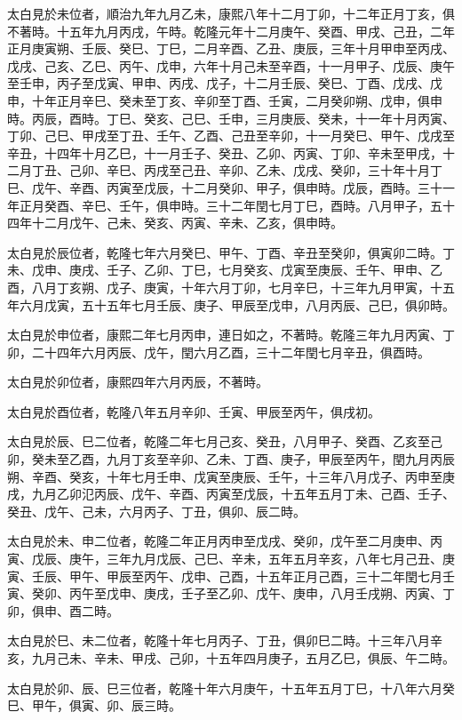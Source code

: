 \begin{pinyinscope}
太白見於未位者，順治九年九月乙未，康熙八年十二月丁卯，十二年正月丁亥，俱不著時。十五年九月丙戌，午時。乾隆元年十二月庚午、癸酉、甲戌、己丑，二年正月庚寅朔、壬辰、癸巳、丁巳，二月辛酉、乙丑、庚辰，三年十月甲申至丙戌、戊戌、己亥、乙巳、丙午、戊申，六年十月己未至辛酉，十一月甲子、戊辰、庚午至壬申，丙子至戊寅、甲申、丙戌、戊子，十二月壬辰、癸巳、丁酉、戊戌、戊申，十年正月辛巳、癸未至丁亥、辛卯至丁酉、壬寅，二月癸卯朔、戊申，俱申時。丙辰，酉時。丁巳、癸亥、己巳、壬申，三月庚辰、癸未，十一年十月丙寅、丁卯、己巳、甲戌至丁丑、壬午、乙酉、己丑至辛卯，十一月癸巳、甲午、戊戌至辛丑，十四年十月乙巳，十一月壬子、癸丑、乙卯、丙寅、丁卯、辛未至甲戌，十二月丁丑、己卯、辛巳、丙戌至己丑、辛卯、乙未、戊戌、癸卯，三十年十月丁巳、戊午、辛酉、丙寅至戊辰，十二月癸卯、甲子，俱申時。戊辰，酉時。三十一年正月癸酉、辛巳、壬午，俱申時。三十二年閏七月丁巳，酉時。八月甲子，五十四年十二月戊午、己未、癸亥、丙寅、辛未、乙亥，俱申時。

太白見於辰位者，乾隆七年六月癸巳、甲午、丁酉、辛丑至癸卯，俱寅卯二時。丁未、戊申、庚戌、壬子、乙卯、丁巳，七月癸亥、戊寅至庚辰、壬午、甲申、乙酉，八月丁亥朔、戊子、庚寅，十年六月丁卯，七月辛巳，十三年九月甲寅，十五年六月戊寅，五十五年七月壬辰、庚子、甲辰至戊申，八月丙辰、己巳，俱卯時。

太白見於申位者，康熙二年七月丙申，連日如之，不著時。乾隆三年九月丙寅、丁卯，二十四年六月丙辰、戊午，閏六月乙酉，三十二年閏七月辛丑，俱酉時。

太白見於卯位者，康熙四年六月丙辰，不著時。

太白見於酉位者，乾隆八年五月辛卯、壬寅、甲辰至丙午，俱戌初。

太白見於辰、巳二位者，乾隆二年七月己亥、癸丑，八月甲子、癸酉、乙亥至己卯，癸未至乙酉，九月丁亥至辛卯、乙未、丁酉、庚子，甲辰至丙午，閏九月丙辰朔、辛酉、癸亥，十年七月壬申、戊寅至庚辰、壬午，十三年八月戊子、丙申至庚戌，九月乙卯氾丙辰、戊午、辛酉、丙寅至戊辰，十五年五月丁未、己酉、壬子、癸丑、戊午、己未，六月丙子、丁丑，俱卯、辰二時。

太白見於未、申二位者，乾隆二年正月丙申至戊戌、癸卯，戊午至二月庚申、丙寅、戊辰、庚午，三年九月戊辰、己巳、辛未，五年五月辛亥，八年七月己丑、庚寅、壬辰、甲午、甲辰至丙午、戊申、己酉，十五年正月己酉，三十二年閏七月壬寅、癸卯、丙午至戊申、庚戌，壬子至乙卯、戊午、庚申，八月壬戌朔、丙寅、丁卯，俱申、酉二時。

太白見於巳、未二位者，乾隆十年七月丙子、丁丑，俱卯巳二時。十三年八月辛亥，九月己未、辛未、甲戌、己卯，十五年四月庚子，五月乙巳，俱辰、午二時。

太白見於卯、辰、巳三位者，乾隆十年六月庚午，十五年五月丁巳，十八年六月癸巳、甲午，俱寅、卯、辰三時。


\end{pinyinscope}
